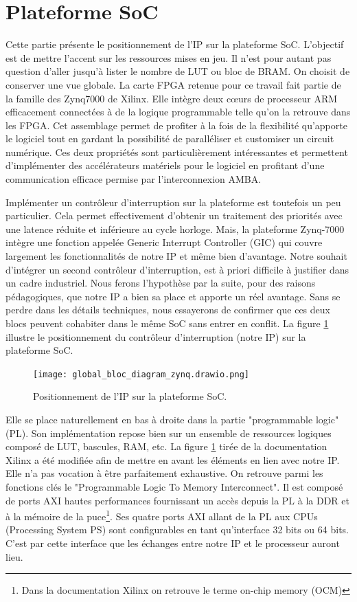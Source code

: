\section{Plateforme SoC}
Cette partie présente le positionnement de l'IP sur la plateforme SoC.
L'objectif est de mettre l'accent sur les ressources mises en jeu.
Il n'est pour autant pas question d'aller jusqu'à lister le nombre de LUT ou bloc de BRAM.
On choisit de conserver une vue globale.
La carte FPGA retenue pour ce travail fait partie de la famille des Zynq7000 de Xilinx.
Elle intègre deux cœurs de processeur ARM efficacement connectées à de la logique programmable telle qu'on la retrouve dans les FPGA.
Cet assemblage permet de profiter à la fois de la flexibilité qu'apporte le logiciel tout en gardant la possibilité de paralléliser et customiser un circuit numérique.
Ces deux propriétés sont particulièrement intéressantes et permettent d'implémenter des accélérateurs matériels pour le logiciel en profitant d'une communication efficace permise par l'interconnexion AMBA\mbox{\textregistered }.

Implémenter un contrôleur d'interruption sur la plateforme est toutefois un peu particulier.
Cela permet effectivement d'obtenir un traitement des priorités avec une latence réduite et inférieure au cycle horloge.
Mais, la plateforme Zynq-7000 intègre une fonction appelée Generic Interrupt Controller (GIC) qui couvre largement les fonctionnalités de notre IP et même bien d'avantage.
Notre souhait d'intégrer un second contrôleur d'interruption, est à priori difficile à justifier dans un cadre industriel.
Nous ferons l'hypothèse par la suite, pour des raisons pédagogiques, que notre IP a bien sa place et apporte un réel avantage.
Sans se perdre dans les détails techniques, nous essayerons de confirmer que ces deux blocs peuvent cohabiter dans le même SoC sans entrer en conflit.
La figure \ref{fig:soc} illustre le positionnement du contrôleur d'interruption (notre IP) sur la plateforme SoC.
\begin{figure}[H]
    \centering
    \texttt{[image: global\_bloc\_diagram\_zynq.drawio.png]}
    \caption{Positionnement de l'IP sur la plateforme SoC.}
    \label{fig:soc}
\end{figure}
Elle se place naturellement en bas à droite dans la partie "programmable logic" (PL).
Son implémentation repose bien sur un ensemble de ressources logiques composé de LUT, bascules, RAM, etc.
La figure \ref{fig:soc} tirée de la documentation Xilinx \cite{Tech_Man_Xilinx} a été modifiée afin de mettre en avant les éléments en lien avec notre IP.
Elle n'a pas vocation à être parfaitement exhaustive.
On retrouve parmi les fonctions clés le "Programmable Logic To Memory Interconnect".
Il est composé de ports AXI hautes performances fournissant un accès depuis la PL à la DDR et à la mémoire de la puce\footnote{Dans la documentation Xilinx on retrouve le terme on-chip memory (OCM)}.
Ses quatre ports AXI allant de la PL aux CPUs (Processing System PS) sont configurables en tant qu'interface 32 bits ou 64 bits.
C'est par cette interface que les échanges entre notre IP et le processeur auront lieu.

